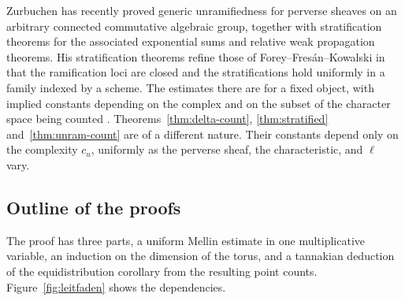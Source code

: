 \documentclass[12pt,reqno]{amsart}
\theoremstyle{definition}
\theoremstyle{plain}
\theoremstyle{definition}
\theoremstyle{remark}
\newcommand{\cu}{c_u}
\begin{document}
Zurbuchen \cite{Zurbuchen2026} has recently proved generic unramifiedness for perverse sheaves on an
arbitrary connected commutative algebraic group, together with stratification theorems for the
associated exponential sums and relative weak propagation theorems.  His stratification theorems refine
those of Forey--Fres\'an--Kowalski in that the ramification loci are closed and the stratifications hold
uniformly in a family indexed by a scheme.  The estimates there are for a fixed object, with implied
constants depending on the complex and on the subset of the character space being counted
\cite[Prop.~2.84]{Zurbuchen2026}.  Theorems~\ref{thm:delta-count}, \ref{thm:stratified}
and~\ref{thm:unram-count} are of a different nature.  Their constants depend only on the complexity
\(\cu\), uniformly as the perverse sheaf, the characteristic, and \(\ell\) vary.

\subsection{Outline of the proofs}
\label{sec:outline}

The proof has three parts, a uniform Mellin estimate in one multiplicative variable, an induction on
the dimension of the torus, and a tannakian deduction of the equidistribution corollary from the
resulting point counts.  Figure~\ref{fig:leitfaden} shows the dependencies.
\end{document}
